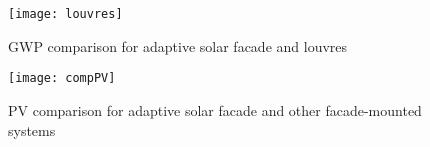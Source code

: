 
\begin{figure}[H]
\begin{center}
\texttt{[image: louvres]}
\caption{GWP comparison for adaptive solar facade and louvres}
\label{louvres}
\end{center}
\end{figure}

\begin{figure}[H]
\begin{center}
\texttt{[image: compPV]}
\caption{PV comparison for adaptive solar facade and other facade-mounted systems}
\label{compPV}
\end{center}
\end{figure}